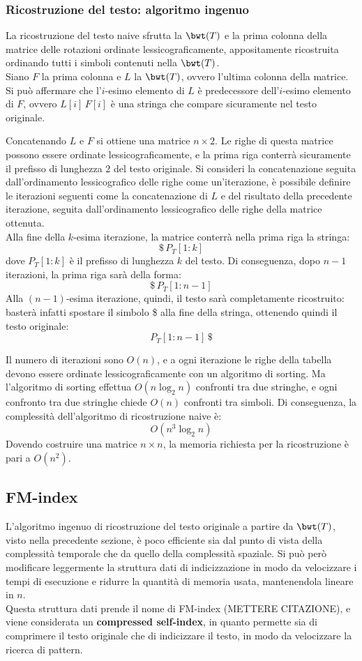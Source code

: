\subsubsection{Ricostruzione del testo: algoritmo ingenuo}
La ricostruzione del testo naive sfrutta la $\bwt(T)$ e la prima colonna della matrice delle rotazioni ordinate lessicograficamente, appositamente ricostruita ordinando tutti i simboli contenuti nella $\bwt(T)$.\\
Siano $F$ la prima colonna e $L$ la $\bwt(T)$, ovvero l'ultima colonna della matrice. Si può affermare che l'$i$-esimo elemento di $L$ è predecessore dell'$i$-esimo elemento di $F$, ovvero $L[i] \, F[i]$ è una stringa che compare sicuramente nel testo originale.

Concatenando $L$ e $F$ si ottiene una matrice $n \times 2$. Le righe di questa matrice possono essere ordinate lessicograficamente, e la prima riga conterrà sicuramente il prefisso di lunghezza $2$ del testo originale.
Si consideri la concatenazione seguita dall'ordinamento lessicografico delle righe come un'iterazione, è possibile definire le iterazioni seguenti come la concatenazione di $L$ e del risultato della precedente iterazione, seguita dall'ordinamento lessicografico delle righe della matrice ottenuta.\\
Alla fine della $k$-esima iterazione, la matrice conterrà nella prima riga la stringa:
\[
    \$ \, P_T[1:k]
\]
dove $P_T[1:k]$ è il prefisso di lunghezza $k$ del testo. Di conseguenza, dopo $n-1$ iterazioni, la prima riga sarà della forma:
\[
    \$ \, P_T[1:n-1]
\]
Alla $(n-1)$-esima iterazione, quindi, il testo sarà completamente ricostruito: basterà infatti spostare il simbolo \$ alla fine della stringa, ottenendo quindi il testo originale:
\[
    P_T[1:n-1] \, \$
\]

Il numero di iterazioni sono $O(n)$, e a ogni iterazione le righe della tabella devono essere ordinate lessicograficamente con un algoritmo di sorting. Ma l'algoritmo di sorting effettua $O(n \log_2n)$ confronti tra due stringhe, e ogni confronto tra due stringhe chiede $O(n)$ confronti tra simboli. Di conseguenza, la complessità dell'algoritmo di ricostruzione naive è:
\[
    O(n^3\log_2n)
\]
Dovendo costruire una matrice $n \times n$, la memoria richiesta per la ricostruzione è pari a $O(n^2)$.

\subsection*{FM-index}
L'algoritmo ingenuo di ricostruzione del testo originale a partire da $\bwt(T)$, visto nella precedente sezione, è poco efficiente sia dal punto di vista della complessità temporale che da quello della complessità spaziale.
Si può però modificare leggermente la struttura dati di indicizzazione in modo da velocizzare i tempi di esecuzione e ridurre la quantità di memoria usata, mantenendola lineare in $n$.\\
Questa struttura dati prende il nome di FM-index (METTERE CITAZIONE), e viene considerata un \textbf{compressed self-index}, in quanto permette sia di comprimere il testo originale che di indicizzare il testo, in modo da velocizzare la ricerca di pattern.

